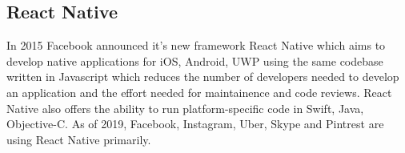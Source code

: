 \subsection{React Native}
In 2015 Facebook announced it's new framework React Native which aims to develop native applications for iOS, Android, UWP using the same codebase written in Javascript which reduces the number of developers needed to develop an application and the effort needed for maintainence and code reviews.
React Native also offers the ability to run platform-specific code in Swift, Java, Objective-C.\cite{hansson2016effects} As of 2019, Facebook, Instagram, Uber, Skype and Pintrest are using React Native primarily.
